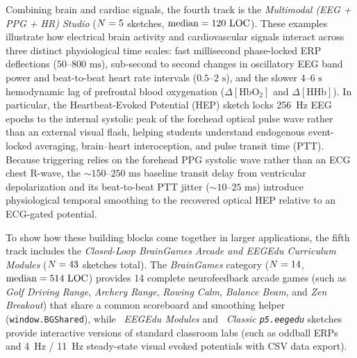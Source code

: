 \documentclass[11pt]{article}
\begin{document}
Combining brain and cardiac signals, the fourth track is the \emph{Multimodal (EEG + PPG + HR) Studio} ($N = 5$ sketches, $\text{median} = 120\text{ LOC}$). These examples illustrate how electrical brain activity and cardiovascular signals interact across three distinct physiological time scales: fast millisecond phase-locked ERP deflections ($50\text{--}800\text{ ms}$), sub-second to second changes in oscillatory EEG band power and beat-to-beat heart rate intervals ($0.5\text{--}2\text{ s}$), and the slower $4\text{--}6\text{ s}$ hemodynamic lag of prefrontal blood oxygenation ($\Delta[\text{HbO}_2]$ and $\Delta[\text{HHb}]$). In particular, the Heartbeat-Evoked Potential (HEP) sketch locks 256~Hz EEG epochs to the internal systolic peak of the forehead optical pulse wave rather than an external visual flash, helping students understand endogenous event-locked averaging, brain--heart interoception, and pulse transit time (PTT). Because triggering relies on the forehead PPG systolic wave rather than an ECG chest R-wave, the $\sim 150\text{--}250\text{ ms}$ baseline transit delay from ventricular depolarization and its beat-to-beat PTT jitter ($\sim 10\text{--}25\text{ ms}$) introduce physiological temporal smoothing to the recovered optical HEP relative to an ECG-gated potential.

To show how these building blocks come together in larger applications, the fifth track includes the \emph{Closed-Loop BrainGames Arcade and EEGEdu Curriculum Modules} ($N = 43$ sketches total). The \emph{BrainGames} category ($N = 14$, $\text{median} = 514\text{ LOC}$) provides 14 complete neurofeedback arcade games (such as \emph{Golf Driving Range}, \emph{Archery Range}, \emph{Rowing Calm}, \emph{Balance Beam}, and \emph{Zen Breakout}) that share a common scoreboard and smoothing helper (\texttt{window.BGShared}), while \NEEGEduModules\ \emph{EEGEdu Modules} and \NClassicEEGEdu\ \emph{Classic \texttt{p5.eegedu}} sketches provide interactive versions of standard classroom labs (such as oddball ERPs and 4~Hz / 11~Hz steady-state visual evoked potentials with CSV data export).
\end{document}
